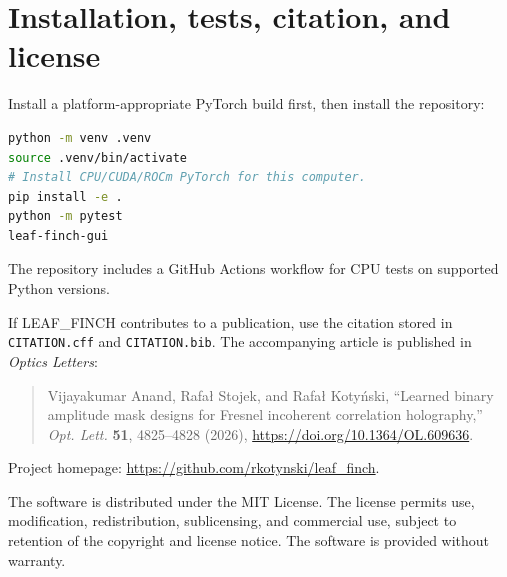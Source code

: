 \documentclass[11pt,a4paper]{article}
\newcommand{\software}{\textsc{LEAF\_FINCH}}
\begin{document}
\section{Installation, tests, citation, and license}
Install a platform-appropriate PyTorch build first, then install the repository:
\begin{lstlisting}[language=bash]
python -m venv .venv
source .venv/bin/activate
# Install CPU/CUDA/ROCm PyTorch for this computer.
pip install -e .
python -m pytest
leaf-finch-gui
\end{lstlisting}
The repository includes a GitHub Actions workflow for CPU tests on supported Python versions.

If \software{} contributes to a publication, use the citation stored in \texttt{CITATION.cff} and \texttt{CITATION.bib}. The accompanying article is published in \emph{Optics Letters}:
\begin{quote}
Vijayakumar Anand, Rafał Stojek, and Rafał Kotyński, ``Learned binary amplitude mask designs for Fresnel incoherent correlation holography,'' \emph{Opt. Lett.} \textbf{51}, 4825--4828 (2026), \href{https://doi.org/10.1364/OL.609636}{https://doi.org/10.1364/OL.609636}.
\end{quote}
Project homepage: \url{https://github.com/rkotynski/leaf_finch}.

The software is distributed under the MIT License. The license permits use, modification, redistribution, sublicensing, and commercial use, subject to retention of the copyright and license notice. The software is provided without warranty.
\end{document}
